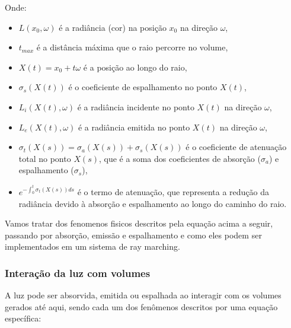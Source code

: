 Onde:
\begin{itemize}
  \item $L(x_0, \omega)$ é a radiância (cor) na posição $x_0$ na direção $\omega$,
  \item $t_{max}$ é a distância máxima que o raio percorre no volume,
  \item $X(t) = x_0 + t\omega$ é a posição ao longo do raio,
  \item $\sigma_s(X(t))$ é o coeficiente de espalhamento no ponto $X(t)$,
  \item $L_i(X(t), \omega)$ é a radiância incidente no ponto $X(t)$ na direção $\omega$,
  \item $L_e(X(t), \omega)$ é a radiância emitida no ponto $X(t)$ na direção $\omega$,
  \item $\sigma_t(X(s)) = \sigma_a(X(s)) + \sigma_s(X(s))$ é o coeficiente de atenuação total no ponto $X(s)$, que é a soma dos coeficientes de absorção ($\sigma_a$) e espalhamento ($\sigma_s$),
  \item $e^{-\int_{0}^{t} \sigma_t(X(s)) ds}$ é o termo de atenuação, que representa a redução da radiância devido à absorção e espalhamento ao longo do caminho do raio.
\end{itemize}

Vamos tratar dos fenomenos fisicos descritos pela equação acima a seguir, passando por absorção, emissão e espalhamento e como eles podem ser implementados em um sistema de ray marching.

\subsubsection{Interação da luz com volumes}

A luz pode ser absorvida, emitida ou espalhada ao interagir com os volumes gerados até aqui, sendo cada um dos fenômenos descritos por uma equação específica:


